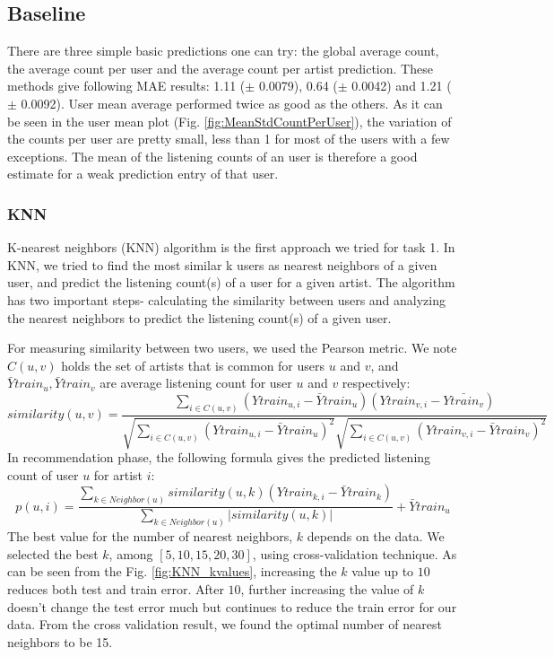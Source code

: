 \subsection{Baseline}
There are three simple basic predictions one can try: the global average count, the average count per user and the average count per artist prediction. These methods give following MAE results:  1.11 ($\pm$ 0.0079), 0.64 ($\pm$ 0.0042) and 1.21 ($\pm$ 0.0092). User mean average performed twice as good as the others. As it can be seen in the user mean plot (Fig. \ref{fig:MeanStdCountPerUser}), the variation of the counts per user are pretty small, less than 1 for most of the users with a few exceptions. The mean of the listening counts of an user is therefore a good estimate for a weak prediction  entry of that user.


\subsubsection{KNN}
K-nearest neighbors (KNN) algorithm is the first approach we tried for task 1. In KNN, we tried to find the most similar k users as nearest neighbors of a given user, and predict the listening count(s) of a user for a given artist. The algorithm has two important steps- calculating the similarity between users and analyzing the nearest neighbors to predict the listening count(s) of a given user. 

For measuring similarity between two users, we used the Pearson metric. We note $C(u,v)$ holds the set of artists that is common for users $u$ and $v$, and $ \bar{Y}train_u,  \bar{Y}train_v$  are average listening count for user $u$ and $v$ respectively:
\begin{equation}
  similarity(u, v)=\frac{\sum_{i\in C(u,v)} (Ytrain_{u,i} - \bar{Y}train_u)(Ytrain_{v,i} - \bar{Ytrain_v})}{\sqrt{\sum_{i\in C(u,v)} (Ytrain_{u,i} - \bar{Y}train_{u})^2} \sqrt{\sum_{i\in C(u,v)} (Ytrain_{v,i} - \bar{Y}train_{v})^2}}
\end{equation}
In recommendation phase, the following formula gives the predicted listening count of user $u$ for artist $i$:
 \begin{equation}
  p(u, i)=\frac{\sum_{k \in Neighbor(u)} similarity(u, k) (Ytrain_{k,i} - \bar{Y}train_k)}{\sum_{k \in Neighbor(u)} | similarity(u, k) |} + \bar{Y}train_u
\end{equation}
The best value for the number of nearest neighbors, $k$ depends on the data. We selected the best $k$, among $[5, 10, 15, 20, 30]$, using cross-validation technique. As can be seen from the Fig. \ref{fig:KNN_kvalues}, increasing the $k$ value up to $10$ reduces both test and train error. After $10$, further increasing the value of $k$ doesn't change the test error much but continues to reduce the train error for our data. From the cross validation result, we found the optimal number of nearest neighbors to be 15.

